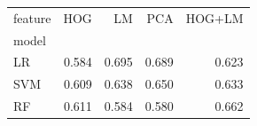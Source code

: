 \begin{tabular}{lrrrr}
\toprule
feature & HOG & LM & PCA & HOG+LM \\
model &  &  &  &  \\
\midrule
LR & 0.584 & 0.695 & 0.689 & 0.623 \\
SVM & 0.609 & 0.638 & 0.650 & 0.633 \\
RF & 0.611 & 0.584 & 0.580 & 0.662 \\
\bottomrule
\end{tabular}
